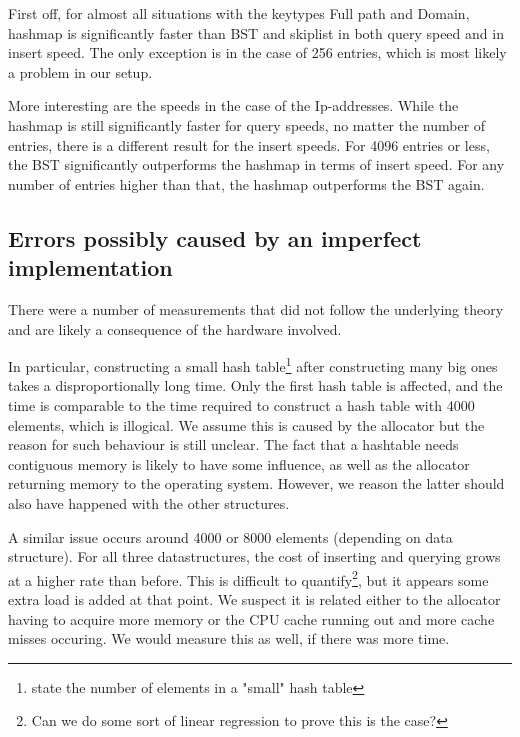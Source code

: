 \documentclass[12pt,a4paper]{article}
\begin{document}
    First off, for almost all situations with the keytypes Full path and Domain, hashmap is significantly faster than BST and skiplist
    in both query speed and in insert speed. The only exception is in the case of 256 entries, which is most likely a
    problem in our setup. 

    More interesting are the speeds in the case of the Ip-addresses. While the hashmap is still significantly faster 
    for query speeds, no matter the number of entries, there is a different result for the insert speeds. For 4096
    entries or less, the BST significantly outperforms the hashmap in terms of insert speed. For any number of 
    entries higher than that, the hashmap outperforms the BST again. 

    
    

    \subsection{Errors possibly caused by an imperfect implementation}

    There were a number of measurements that did not follow the underlying theory and are likely a
    consequence of the hardware involved.

    In particular, constructing a small hash table\footnote{state the number of elements in a
    "small" hash table} after constructing many big ones takes a disproportionally long time.  Only
    the first hash table is affected, and the time is comparable to the time required to construct a
    hash table with 4000 elements, which is illogical.  We assume this is caused by the allocator
    but the reason for such behaviour is still unclear.  The fact that a hashtable needs contiguous
    memory is likely to have some influence, as well as the allocator returning memory to the
    operating system.  However, we reason the latter should also have happened with the other
    structures.

    A similar issue occurs around 4000 or 8000 elements (depending on data structure).  For all
    three datastructures, the cost of inserting and querying grows at a higher rate than before.
    This is difficult to quantify\footnote{Can we do some sort of linear regression to prove this is
    the case?}, but it appears some extra load is added at that point.  We suspect it is related
    either to the allocator having to acquire more memory or the CPU cache running out and more
    cache misses occuring.  We would measure this as well, if there was more time.
\end{document}
